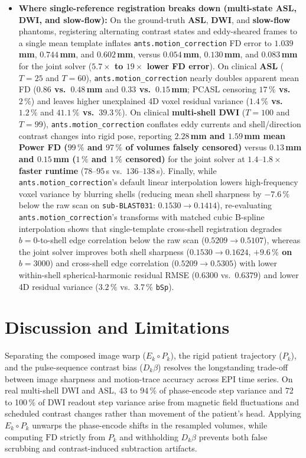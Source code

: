 \documentclass[11pt]{article}
\begin{document}
\begin{itemize}
\item \textbf{Where single-reference registration breaks down (multi-state ASL, DWI, and slow-flow):} On the ground-truth \textbf{ASL}, \textbf{DWI}, and \textbf{slow-flow} phantoms, registering alternating contrast states and eddy-sheared frames to a single mean template inflates \texttt{ants.motion\_correction} FD error to \textbf{$1.039$\,mm}, \textbf{$0.744$\,mm}, and \textbf{$0.602$\,mm}, versus \textbf{$0.054$\,mm}, \textbf{$0.130$\,mm}, and \textbf{$0.083$\,mm} for the joint solver (\textbf{$5.7\times$ to $19\times$ lower FD error}). On clinical \textbf{ASL} ($T = 25$ and $T = 60$), \texttt{ants.motion\_correction} nearly doubles apparent mean FD (\textbf{$0.86$ vs.\ $0.48$\,mm} and \textbf{$0.33$ vs.\ $0.15$\,mm}; PCASL censoring \textbf{$17\,\%$ vs.\ $2\,\%$}) and leaves higher unexplained 4D voxel residual variance (\textbf{$1.4\,\%$ vs.\ $1.2\,\%$} and \textbf{$41.1\,\%$ vs.\ $39.3\,\%$}). On clinical \textbf{multi-shell DWI} ($T = 100$ and $T = 99$), \texttt{ants.motion\_correction} conflates eddy currents and shell/direction contrast changes into rigid pose, reporting \textbf{$2.28$\,mm and $1.59$\,mm mean Power FD ($99\,\%$ and $97\,\%$ of volumes falsely censored)} versus \textbf{$0.13$\,mm and $0.15$\,mm ($1\,\%$ and $1\,\%$ censored)} for the joint solver at \textbf{$1.4\text{--}1.8\times$ faster runtime} ($78\text{--}95$\,s vs.\ $136\text{--}138$\,s). Finally, while \texttt{ants.motion\_correction}'s default linear interpolation lowers high-frequency voxel variance by blurring shells (reducing mean shell sharpness by \textbf{$-7.6\,\%$} below the raw scan on \texttt{sub-BLAST031}: $0.1530 \to 0.1414$), re-evaluating \texttt{ants.motion\_correction}'s transforms with matched cubic B-spline interpolation shows that single-template cross-shell registration degrades $b = 0$-to-shell edge correlation below the raw scan ($0.5209 \to 0.5107$), whereas the joint solver improves both shell sharpness ($0.1530 \to 0.1624$, \textbf{$+9.6\,\%$ on $b = 3000$}) and cross-shell edge correlation ($0.5209 \to 0.5305$) with lower within-shell spherical-harmonic residual RMSE ($0.6300$ vs.\ $0.6379$) and lower 4D residual variance ($3.2\,\%$ vs.\ $3.7\,\%$ \texttt{bSp}).
\end{itemize}

\section*{Discussion and Limitations}

Separating the composed image warp ($E_k \circ P_k$), the rigid patient trajectory ($P_k$), and the pulse-sequence contrast bias ($D_k\beta$) resolves the longstanding trade-off between image sharpness and motion-trace accuracy across EPI time series. On real multi-shell DWI and ASL, 43 to 94\,\% of phase-encode step variance and 72 to 100\,\% of DWI readout step variance arise from magnetic field fluctuations and scheduled contrast changes rather than movement of the patient's head. Applying $E_k \circ P_k$ unwarps the phase-encode shifts in the resampled volumes, while computing $\text{FD}$ strictly from $P_k$ and withholding $D_k\beta$ prevents both false scrubbing and contrast-induced subtraction artifacts.
\end{document}
